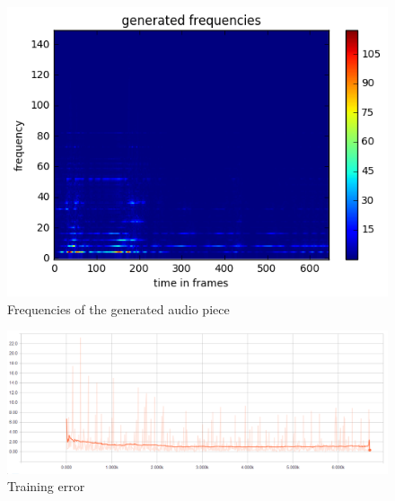 \documentclass[10pt,conference,compsocconf]{IEEEtran}
\begin{document}
\begin{figure}[tbp]
  \centering
  \includegraphics[width=\columnwidth]{figures/generated_frequencies_20s_2.png}
  \caption{Frequencies of the generated audio piece}
  \label{fig:generated_frequencies}
\end{figure}

\begin{figure}[tbp]
  \centering
  \includegraphics[width=\textwidth]{figures/loss.png}
  \caption{Training error}
  \label{fig:training_error}
\end{figure}
\end{document}
